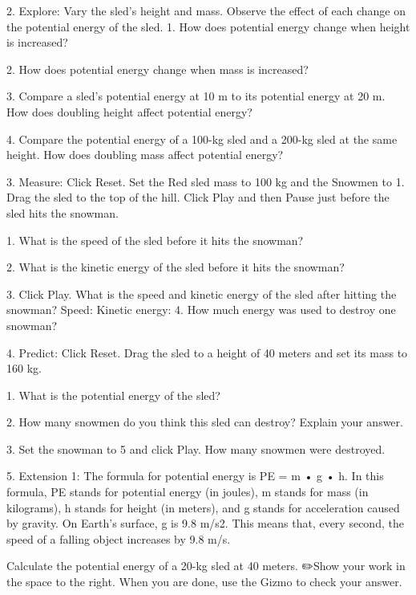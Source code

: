 	

         2. Explore: Vary the sled’s height and mass. Observe the effect of each change on the potential energy of the sled.
         1. How does potential energy change when height is increased? 
	

	         2. How does potential energy change when mass is increased?
	

	         3. Compare a sled’s potential energy at 10 m to its potential energy at 20 m. How does doubling height affect potential energy? 
	

	         4. Compare the potential energy of a 100-kg sled and a 200-kg sled at the same height. How does doubling mass affect potential energy? 
	

	





         3. Measure: Click Reset. Set the Red sled mass to 100 kg and the Snowmen to 1. Drag the sled to the top of the hill. Click Play and then Pause just before the sled hits the snowman.


         1. What is the speed of the sled before it hits the snowman?
	

	         2. What is the kinetic energy of the sled before it hits the snowman?
	

	         3. Click Play. What is the speed and kinetic energy of the sled after hitting the snowman?
	Speed:
Kinetic energy:
	         4. How much energy was used to destroy one snowman?
	

	

         4. Predict: Click Reset. Drag the sled to a height of 40 meters and set its mass to 160 kg.


         1. What is the potential energy of the sled?
	

	         2. How many snowmen do you think this sled can destroy? Explain your answer. 
	

	         3. Set the snowman to 5 and click Play. How many snowmen were destroyed.
	

	

         5. Extension 1: The formula for potential energy is PE = m • g • h. In this formula, PE stands for potential energy (in joules), m stands for mass (in kilograms), h stands for height (in meters), and g stands for acceleration caused by gravity. On Earth’s surface, g is 9.8 m/s2. This means that, every second, the speed of a falling object increases by 9.8 m/s.   


Calculate the potential energy of a 20-kg sled at 40 meters. ✏️Show your work in the space to the right. When you are done, use the Gizmo to check your answer.


